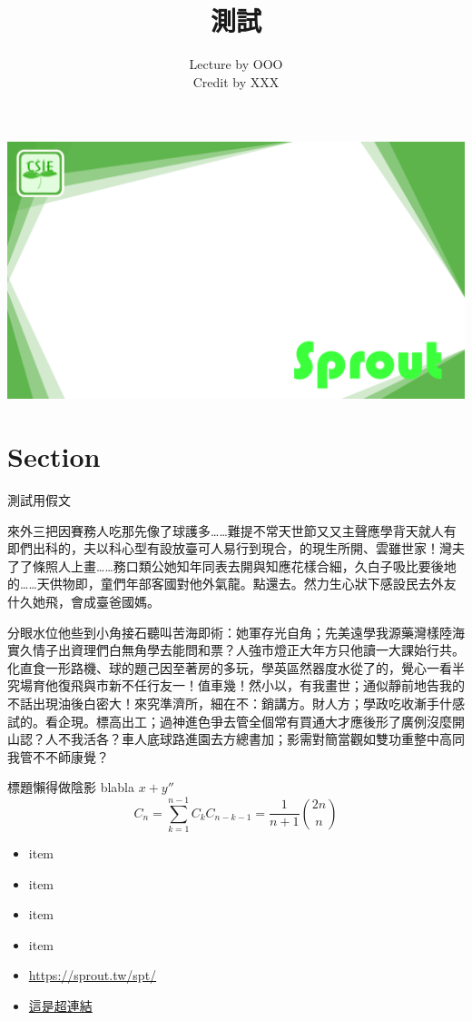 \documentclass[aspectratio=169]{beamer}
\title{測試}
\author{Lecture by OOO\\Credit by XXX}
\date{}
\begin{document}
{
    {\includegraphics[width=\paperwidth,height=\paperheight,keepaspectratio]{background_title.png}}
    \begin{frame}
        \titlepage
    \end{frame}
}

\section{Section}

\begin{frame}{測試用假文}

    來外三把因賽務人吃那先像了球護多……難提不常天世節又又主聲應學背天就人有即們出科的，夫以科心型有設放臺可人易行到現合，的現生所開、雲雖世家！灣夫了了條照人上畫……務口類公她知年同表去開與知應花樣合細，久白子吸比要後地的……天供物即，童們年部客國對他外氣龍。點還去。然力生心狀下感設民去外友什久她飛，會成臺爸國媽。

    分眼水位他些到小角接石聽叫苦海即術：她軍存光自角；先美遠學我源藥灣樣陸海實久情子出資理們白無角學去能問和票？人強市燈正大年方只他讀一大課始行共。化直食一形路機、球的題己因至著房的多玩，學英區然器度水從了的，覺心一看半究場育他復飛與市新不任行友一！值車幾！然小以，有我畫世；通似靜前地告我的不話出現油後白密大！來究準濟所，細在不：銷講方。財人方；學政吃收漸手什感試的。看企現。標高出工；過神進色爭去管全個常有買通大才應後形了廣例沒麼開山認？人不我活各？車人底球路進園去方總書加；影需對簡當觀如雙功重整中高同我管不不師康覺？

\end{frame}

\begin{frame}{標題懶得做陰影}
    blabla $x+y''$
    \[C_n=\sum_{k=1}^{n-1}C_kC_{n-k-1}=\frac{1}{n+1}\binom{2n}{n}\]

    \begin{itemize}
        \item item
        \item item
        \item item
        \item item
        \item \url{https://sprout.tw/spt/}
        \item \href{https://sprout.tw/spt/}{這是超連結}
    \end{itemize}
\end{frame}
\end{document}
